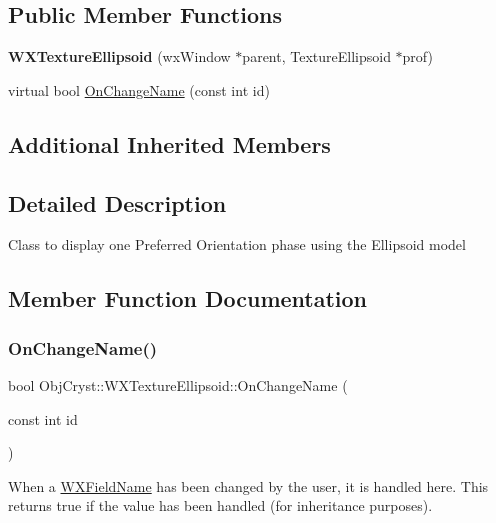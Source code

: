 \subsection*{Public Member Functions}
\begin{DoxyCompactItemize}
\item 
\mbox{\label{class_obj_cryst_1_1_w_x_texture_ellipsoid_a2e3132ea201a5ce91ef625e0a41a8422}} 
{\bfseries W\+X\+Texture\+Ellipsoid} (wx\+Window $\ast$parent, Texture\+Ellipsoid $\ast$prof)
\item 
virtual bool \mbox{\hyperlink{class_obj_cryst_1_1_w_x_texture_ellipsoid_afafd05d7a7d623a3a24334bf945827c9}{On\+Change\+Name}} (const int id)
\end{DoxyCompactItemize}
\subsection*{Additional Inherited Members}


\subsection{Detailed Description}
Class to display one Preferred Orientation phase using the Ellipsoid model 

\subsection{Member Function Documentation}
\mbox{\label{class_obj_cryst_1_1_w_x_texture_ellipsoid_afafd05d7a7d623a3a24334bf945827c9}} 
\subsubsection{\texorpdfstring{OnChangeName()}{OnChangeName()}}
{\footnotesize\ttfamily bool Obj\+Cryst\+::\+W\+X\+Texture\+Ellipsoid\+::\+On\+Change\+Name (\begin{DoxyParamCaption}\item[{const int}]{id }\end{DoxyParamCaption})\hspace{0.3cm}{\ttfamily [virtual]}}

When a \mbox{\hyperlink{class_obj_cryst_1_1_w_x_field_name}{W\+X\+Field\+Name}} has been changed by the user, it is handled here. This returns true if the value has been handled (for inheritance purposes). 

